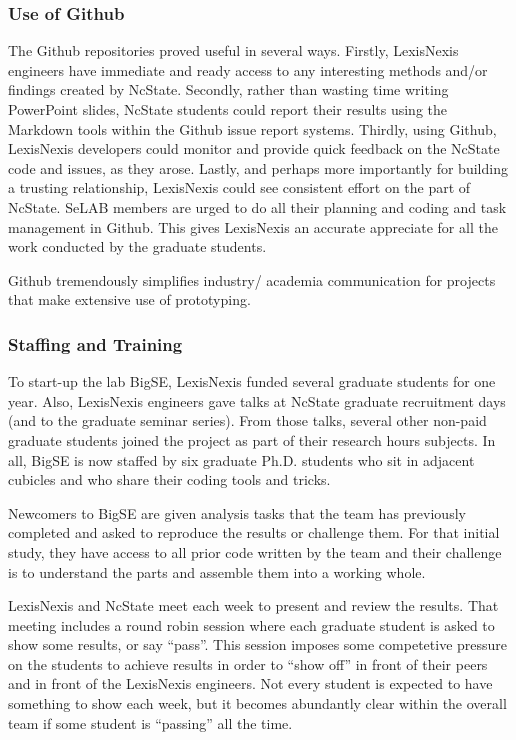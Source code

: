 \documentclass{sig-alternate-05-2015}
\theoremstyle{break}
\begin{document}
 \subsubsection{Use of Github}
The Github repositories proved useful in several  ways.
Firstly,
 LexisNexis  engineers have immediate and ready access to 
 any interesting methods and/or findings created by NcState. 
Secondly,
rather than wasting time writing PowerPoint slides, NcState students could
report their results using the Markdown tools within the Github issue
report systems.
Thirdly, using Github, LexisNexis developers could monitor and provide
quick feedback on the NcState code and issues,
as they arose.
Lastly, and perhaps more importantly for building
a trusting relationship,
LexisNexis could see consistent effort on the part of NcState. SeLAB members
are urged to do all their planning and coding and task management in Github.
This gives LexisNexis an accurate appreciate for all the work conducted
by the graduate students.
 \begin{lesson}
Github tremendously simplifies  industry/ academia communication for projects
that make extensive use of prototyping.
\end{lesson}

 \subsubsection{Staffing and Training}
To start-up the lab  BigSE, LexisNexis funded several graduate students for one year. Also,
LexisNexis engineers gave talks at NcState graduate recruitment days (and to
the graduate seminar series). From those talks, several other non-paid graduate students
joined the project as part of their research hours subjects. In all, BigSE is
now staffed by six graduate Ph.D. students who sit in adjacent cubicles and who
 share their coding tools and tricks. 

Newcomers to BigSE are given analysis tasks
 that the team has previously completed and asked to reproduce the results or challenge them. For
 that initial study, they have access to all prior code written by the team
 and their challenge is to understand the parts and assemble them into a working
 whole. 
 
  LexisNexis and NcState meet each week to present and review the results. That meeting includes
a round robin session where each graduate student is asked to show some results,
or say ``pass''. This session imposes some competetive pressure on the students to achieve
results in order to ``show off'' in front of their peers and in front of the
LexisNexis engineers. Not every student is expected to have something to show each week,
but it becomes abundantly  clear within the overall team if some student is ``passing'' all
the time.
\end{document}
